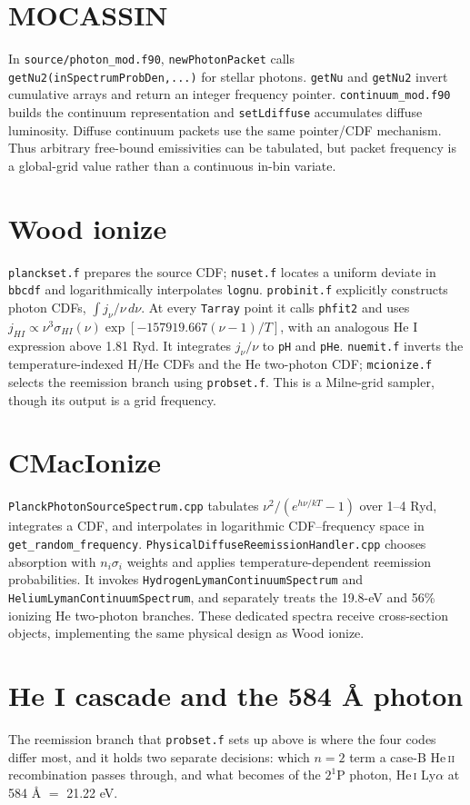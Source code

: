 \documentclass[11pt]{my_memo}
\begin{document}
\section{MOCASSIN}
In \texttt{source/photon\_mod.f90}, \texttt{newPhotonPacket} calls \texttt{getNu2(inSpectrumProbDen,...)} for stellar photons.  \texttt{getNu} and \texttt{getNu2} invert cumulative arrays and return an integer frequency pointer.  \texttt{continuum\_mod.f90} builds the continuum representation and \texttt{setLdiffuse} accumulates diffuse luminosity.  Diffuse continuum packets use the same pointer/CDF mechanism.  Thus arbitrary free-bound emissivities can be tabulated, but packet frequency is a global-grid value rather than a continuous in-bin variate.
\section{Wood ionize}
\texttt{planckset.f} prepares the source CDF; \texttt{nuset.f} locates a uniform deviate in \texttt{bbcdf} and logarithmically interpolates \texttt{lognu}.  \texttt{probinit.f} explicitly constructs photon CDFs, $\int j_\nu/\nu\,d\nu$.  At every \texttt{Tarray} point it calls \texttt{phfit2} and uses $j_{HI}\propto\nu^3\sigma_{HI}(\nu)\exp[-157919.667(\nu-1)/T]$, with an analogous He I expression above 1.81 Ryd.  It integrates $j_\nu/\nu$ to \texttt{pH} and \texttt{pHe}.  \texttt{nuemit.f} inverts the temperature-indexed H/He CDFs and the He two-photon CDF; \texttt{mcionize.f} selects the reemission branch using \texttt{probset.f}.  This is a Milne-grid sampler, though its output is a grid frequency.
\section{CMacIonize}
\texttt{PlanckPhotonSourceSpectrum.cpp} tabulates $\nu^2/(e^{h\nu/kT}-1)$ over 1--4 Ryd, integrates a CDF, and interpolates in logarithmic CDF--frequency space in \texttt{get\_random\_frequency}.  \texttt{PhysicalDiffuseReemissionHandler.cpp} chooses absorption with $n_i\sigma_i$ weights and applies temperature-dependent reemission probabilities.  It invokes \texttt{HydrogenLymanContinuumSpectrum} and \texttt{HeliumLymanContinuumSpectrum}, and separately treats the 19.8-eV and 56\% ionizing He two-photon branches.  These dedicated spectra receive cross-section objects, implementing the same physical design as Wood ionize.
\section{He I cascade and the 584 \AA{} photon}\label{sec:hei}
The reemission branch that \texttt{probset.f} sets up above is where the four codes differ most, and it holds two separate decisions: which $n=2$ term a case-B He\,\textsc{ii} recombination passes through, and what becomes of the $2^1$P photon, He\,\textsc{i} Ly$\alpha$ at 584 \AA{} $=$ 21.22 eV.
\end{document}
